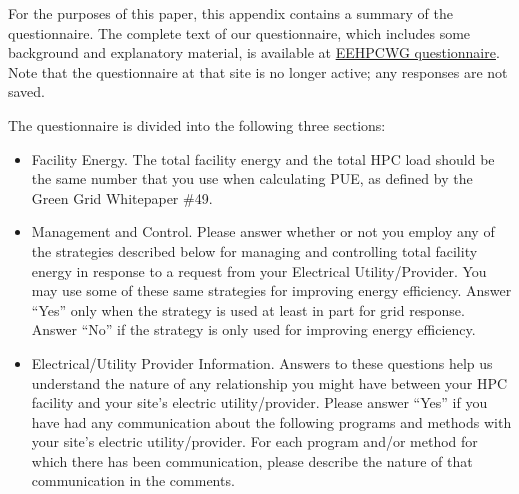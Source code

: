 For the purposes of this paper, this appendix contains a summary of the questionnaire.
The complete text of our questionnaire, which includes some background 
and explanatory material, is available at
\href{https://www.surveymonkey.com/s.aspx?sm=Y%2feFYAHaRP1tw5bhUMdtfg%3d%3d}{EEHPCWG questionnaire}.
Note that the questionnaire at that site is no longer active; any responses are not saved.

The questionnaire is divided into the following three sections: 
\begin{itemize}

\item
Facility Energy. The total facility energy and the total HPC load should be the 
same number that you use when 
calculating PUE, as defined by the Green Grid Whitepaper \#49.

\item
Management and Control. 
Please answer whether or not you employ any of the strategies described below for managing 
and controlling total facility energy in response to a request from your Electrical Utility/Provider.
You may use some of these same strategies for improving energy efficiency. 
Answer ``Yes'' only when the strategy is used at least in part for grid response. 
Answer ``No'' if the strategy is only used for improving energy efficiency.

\item
Electrical/Utility Provider Information.
Answers to these questions help us understand the nature of any relationship you might have 
between your HPC facility and your site's electric utility/provider.
Please answer ``Yes'' if you have had any communication about the following programs and 
methods with your site's electric utility/provider.
For each program and/or method for which there has been communication, please describe 
the nature of that communication in the comments.
\end{itemize}

